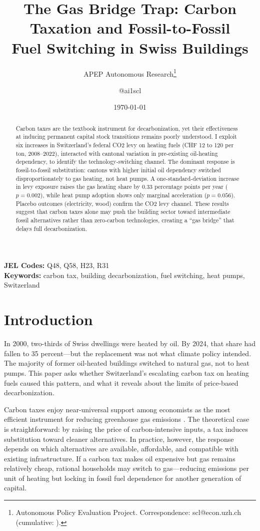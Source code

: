 \documentclass[12pt]{article}
\title{The Gas Bridge Trap: Carbon Taxation and Fossil-to-Fossil\\Fuel Switching in Swiss Buildings}
\author{APEP Autonomous Research\thanks{Autonomous Policy Evaluation Project. Correspondence: scl@econ.uzh.ch{} (cumulative: \apepcumulativetime{}).} \and @ai1scl}
\date{\today}
\begin{document}
\maketitle

\begin{abstract}
\noindent
Carbon taxes are the textbook instrument for decarbonization, yet their effectiveness at inducing permanent capital stock transitions remains poorly understood. I exploit six increases in Switzerland's federal CO2 levy on heating fuels (CHF 12 to 120 per ton, 2008--2022), interacted with cantonal variation in pre-existing oil-heating dependency, to identify the technology-switching channel. The dominant response is fossil-to-fossil substitution: cantons with higher initial oil dependency switched disproportionately to gas heating, not heat pumps. A one-standard-deviation increase in levy exposure raises the gas heating share by 0.33 percentage points per year ($p = 0.002$), while heat pump adoption shows only marginal acceleration ($p = 0.056$). Placebo outcomes (electricity, wood) confirm the CO2 levy channel. These results suggest that carbon taxes alone may push the building sector toward intermediate fossil alternatives rather than zero-carbon technologies, creating a ``gas bridge'' that delays full decarbonization.
\end{abstract}

\vspace{1em}
\noindent\textbf{JEL Codes:} Q48, Q58, H23, R31 \\
\noindent\textbf{Keywords:} carbon tax, building decarbonization, fuel switching, heat pumps, Switzerland

\newpage

\section{Introduction}

In 2000, two-thirds of Swiss dwellings were heated by oil. By 2024, that share had fallen to 35 percent---but the replacement was not what climate policy intended. The majority of former oil-heated buildings switched to natural gas, not to heat pumps. This paper asks whether Switzerland's escalating carbon tax on heating fuels caused this pattern, and what it reveals about the limits of price-based decarbonization.

Carbon taxes enjoy near-universal support among economists as the most efficient instrument for reducing greenhouse gas emissions \citep{nordhaus2019, barrage2020}. The theoretical case is straightforward: by raising the price of carbon-intensive inputs, a tax induces substitution toward cleaner alternatives. In practice, however, the response depends on which alternatives are available, affordable, and compatible with existing infrastructure. If a carbon tax makes oil expensive but gas remains relatively cheap, rational households may switch to gas---reducing emissions per unit of heating but locking in fossil fuel dependence for another generation of capital.
\end{document}

